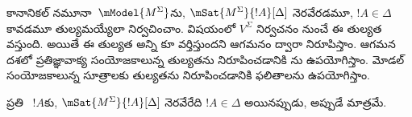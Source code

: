 \documentclass[../../../include/open-logic-section]{subfiles}
\begin{document}


కానానికల్ నమూనా~$\mModel{M^\Sigma}$ను, $\mSat{M^\Sigma}{!A}[\Delta]$
నెరవేరడమూ, $!A \in \Delta$ కావడమూ తుల్యమయ్యేలా నిర్వచించాం.
 విషయంలో
$V^\Sigma$ నిర్వచనం నుంచే ఈ తుల్యత వస్తుంది. అయితే ఈ
తుల్యత అన్ని కూ వర్తిస్తుందని
ఆగమనం ద్వారా నిరూపిస్తాం. ఆగమన దశలో ప్రతిజ్ఞావాక్య సంయోజకాలున్న
 తుల్యతను నిరూపించడానికి
ను ఉపయోగిస్తాం. మోడల్ సంయోజకాలున్న
సూత్రాలకు తుల్యతను నిరూపించడానికి  ఫలితాలను
ఉపయోగిస్తాం.

\begin{prop}[సత్య ఉపసిద్ధాంతం]
  ప్రతి ~$!A$కు,
  $\mSat{M^\Sigma}{!A}[\Delta]$ నెరవేరేది
  $!A \in \Delta$ అయినప్పుడు, అప్పుడే మాత్రమే.
\end{prop}
\end{document}
